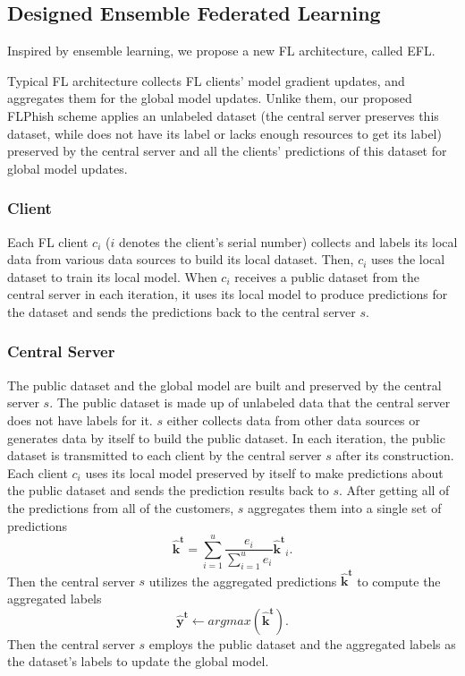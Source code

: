 \documentclass[journal]{IEEEtran}
\begin{document}
\subsection{Designed Ensemble Federated Learning}
Inspired by ensemble learning, we propose a new FL architecture, called EFL.
\par Typical FL architecture collects FL clients' model gradient updates, and aggregates them for the global model updates. Unlike them, our proposed FLPhish scheme applies an unlabeled dataset (the central server preserves this dataset, while does not have its label or lacks enough resources to get its label) preserved by the central server and all the clients' predictions of this dataset for global model updates.
\subsubsection{{Client}} Each FL client {$c_{i}$} ($i$ denotes the client's serial number) collects and labels its local data from various data sources to build its local dataset. Then, {$c_{i}$} uses the local dataset to train its local model. When {$c_{i}$} receives a public dataset from the central server in each iteration, it uses its local model to produce predictions for the dataset and sends the predictions back to the central server $s$.
\subsubsection{{Central Server}} The public dataset and the global model are built and preserved by the central server $s$. The public dataset is made up of unlabeled data that the central server does not have labels for it. $s$ either collects data from other data sources or generates data by itself to build the public dataset. In each iteration, the public dataset is transmitted to each client by the central server $s$ after its construction. Each client $c_i$ uses its local model preserved by itself to make predictions about the public dataset and sends the prediction results back to $s$. After getting all of the predictions from all of the customers, $s$ aggregates them into a single set of predictions
\begin{equation}
\mathbf{\hat{k}^t}=\sum_{i=1}^{u}\frac{e_i}{\sum_{i=1}^{u}e_i}\mathbf{\hat{k}^t}_i.
\end{equation}
Then the central server $s$ utilizes the aggregated predictions $\mathbf{\hat{k}^t}$ to compute the aggregated labels
\begin{equation}
\mathbf{\hat{y}^t}\gets argmax(\mathbf{\hat{k}^t}).
\end{equation} 
Then the central server {$s$} employs the public dataset and the aggregated labels as the dataset's labels to update the global model.
\end{document}
